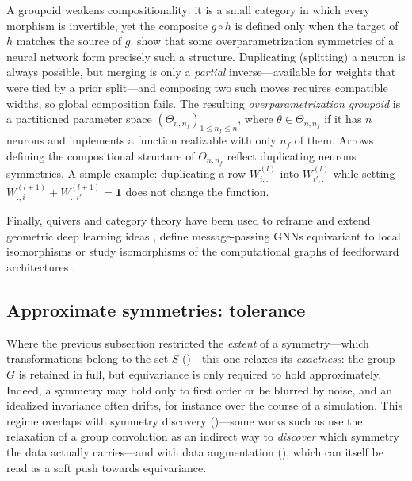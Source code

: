 \documentclass[mathematics,review,submit,moreauthors]{Definitions/mdpi}
\begin{document}
A groupoid weakens compositionality: it is a small category in which every morphism is invertible, yet the composite $g\circ h$ is defined only when the target of $h$ matches the source of $g$.
\citet{sareen2026} show that some overparametrization symmetries of a neural network form precisely such a structure.
Duplicating (splitting) a neuron is always possible, but merging is only a \emph{partial} inverse---available for weights that were tied by a prior split---and composing two such moves requires compatible widths, so global composition fails.
The resulting \emph{overparametrization groupoid} is a partitioned parameter space $(\Theta_{n,n_f})_{1\le n_f\le n}$, where $\theta\in\Theta_{n,n_f}$ if it has $n$ neurons and implements a function realizable with only $n_f$ of them.
Arrows defining the compositional structure of $\Theta_{n, n_f}$ reflect duplicating neurons symmetries.
A simple example: duplicating a row $W^{(l)}_{i,.}$ into $W^{(l)}_{i',.}$  while setting $W^{(l+1)}_{.,i}+W^{(l+1)}_{.,i'}=\boldsymbol 1$ does not change the function.

Finally, quivers and category theory have been used to reframe and extend geometric deep learning ideas \citep{gavranovic2024}, define message-passing GNNs equivariant to local isomorphisms \citep{dehaan2020} or study isomorphisms of the computational graphs of feedforward architectures \citep{armenta2021a}.

\subsection{Approximate symmetries: tolerance}\label{sec:soft-equivariance}

Where the previous subsection restricted the \emph{extent} of a symmetry---which transformations belong to the set $S$ ()---this one relaxes its \emph{exactness}: the group $G$ is retained in full, but equivariance is only required to hold approximately.
Indeed, a symmetry may hold only to first order or be blurred by noise, and an idealized invariance often drifts, for instance over the course of a simulation.
This regime overlaps with symmetry discovery ()---some works such as \citet{wang2024p4icml} use the relaxation of a group convolution as an indirect way to \emph{discover} which symmetry the data actually carries---and with data augmentation (), which can itself be read as a soft push towards equivariance.
\end{document}
